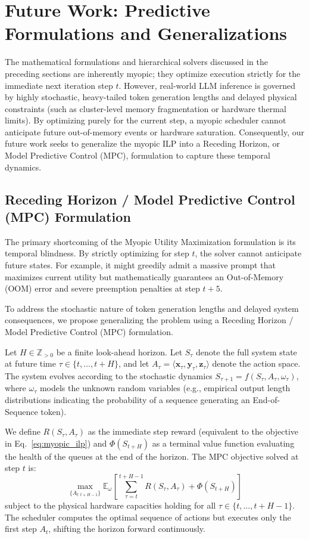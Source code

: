 \documentclass[11pt]{article}
\begin{document}
\section{Future Work: Predictive Formulations and Generalizations}
\label{sec:future_work}

The mathematical formulations and hierarchical solvers discussed in the preceding sections are inherently myopic; they optimize execution strictly for the immediate next iteration step $t$. However, real-world LLM inference is governed by highly stochastic, heavy-tailed token generation lengths and delayed physical constraints (such as cluster-level memory fragmentation or hardware thermal limits). By optimizing purely for the current step, a myopic scheduler cannot anticipate future out-of-memory events or hardware saturation. Consequently, our future work seeks to generalize the myopic ILP into a Receding Horizon, or Model Predictive Control (MPC), formulation to capture these temporal dynamics.

\subsection{Receding Horizon / Model Predictive Control (MPC) Formulation}
\label{subsec:mpc_formulation}

The primary shortcoming of the Myopic Utility Maximization formulation is its temporal blindness. By strictly optimizing for step $t$, the solver cannot anticipate future states. For example, it might greedily admit a massive prompt that maximizes current utility but mathematically guarantees an Out-of-Memory (OOM) error and severe preemption penalties at step $t+5$.

To address the stochastic nature of token generation lengths and delayed system consequences, we propose generalizing the problem using a Receding Horizon / Model Predictive Control (MPC) formulation.

Let $H \in \mathbb{Z}_{> 0}$ be a finite look-ahead horizon. Let $S_\tau$ denote the full system state at future time $\tau \in \{t, \dots, t+H\}$, and let $A_\tau = \langle \mathbf{x}_\tau, \mathbf{y}_\tau, \mathbf{z}_\tau \rangle$ denote the action space. The system evolves according to the stochastic dynamics $S_{\tau+1} = f(S_\tau, A_\tau, \omega_\tau)$, where $\omega_\tau$ models the unknown random variables (e.g., empirical output length distributions indicating the probability of a sequence generating an End-of-Sequence token).

We define $R(S_\tau, A_\tau)$ as the immediate step reward (equivalent to the objective in Eq.~\ref{eq:myopic_ilp}) and $\Phi(S_{t+H})$ as a terminal value function evaluating the health of the queues at the end of the horizon. The MPC objective solved at step $t$ is:
\begin{equation}
\label{eq:mpc_objective}
    \max_{\{A_{t:t+H-1}\}} \mathbb{E}_{\omega} \left[ \sum_{\tau=t}^{t+H-1} R(S_\tau, A_\tau) + \Phi(S_{t+H}) \right]
\end{equation}
subject to the physical hardware capacities holding for all $\tau \in \{t, \dots, t+H-1\}$. The scheduler computes the optimal sequence of actions but executes only the first step $A_t$, shifting the horizon forward continuously.
\end{document}
